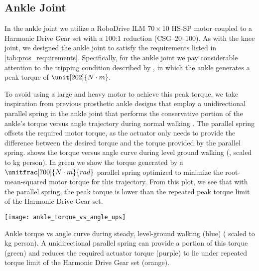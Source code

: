 \subsection{Ankle Joint}
In the ankle joint we utilize a RoboDrive ILM $70\times10$ HS-SP motor coupled
to a Harmonic Drive Gear set with a 100:1 reduction (CSG--20--100). As with the
knee joint, we designed the ankle joint to satisfy the requirements listed in
\cref{tab:pros_requirements}. Specifically, for the ankle joint we pay
considerable attention to the tripping condition described by
\citet{pijnappels2005early}, in which the ankle generates a peak torque of
$\unit[202]{N \cdot m}$. 

To avoid using a large and heavy motor to achieve this peak torque, we take
inspiration from previous prosthetic ankle designs that employ a unidirectional
parallel spring in the ankle joint that performs the conservative portion of the
ankle's torque versus angle trajectory during normal walking
\citep{au2007biomechanical,au2008powered,sup2009preliminary,lawson2014robotic}.
The parallel spring offsets the required motor torque, as the actuator only
needs to provide the difference between the desired torque and the torque
provided by the parallel spring.  shows the
torque versus angle curve during level ground walking
(\citet{winter2009biomechanics}, scaled to \unit[80]{kg} person). In green we
show the torque generated by a $\unitfrac[700]{N \cdot m}{rad}$ parallel spring
optimized to minimize the root-mean-squared motor torque for this trajectory.
From this plot, we see that with the parallel spring, the peak torque is lower
than the repeated peak torque limit of the Harmonic Drive Gear set.

\begin{marginfigure}[-0in]
    \centering 
    \texttt{[image: ankle\_torque\_vs\_angle\_ups]}
    \caption[Ankle torque vs angle curve during steady, level-ground
    walking]{Ankle torque vs angle curve during steady, level-ground walking
    (blue) (\citet{winter2009biomechanics} scaled to \unit[80]{kg} person). A
    unidirectional parallel spring can provide a portion of this torque (green)
    and reduces the required actuator torque (purple) to lie under repeated
    torque limit of the Harmonic Drive Gear set (orange).
    }\label{fig:ankle_torque_vs_angle_ups}
\end{marginfigure}

